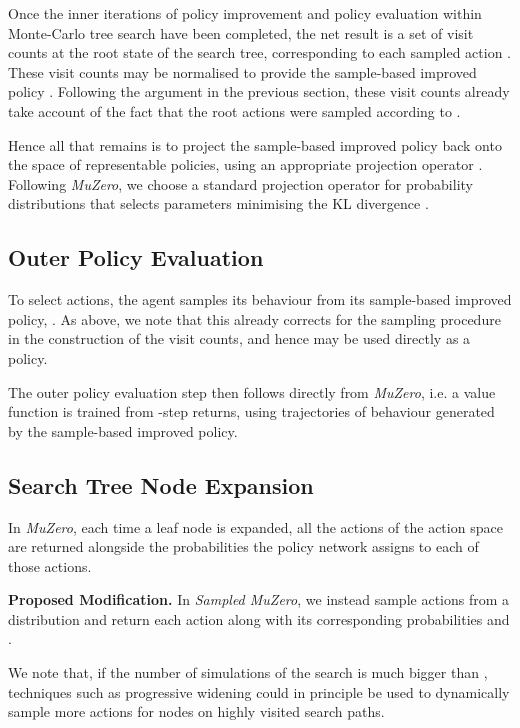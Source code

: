 \documentclass{article}
\newcommand{\muzero}{\emph{MuZero}}
\newcommand{\smuzero}{\emph{Sampled MuZero}}
\begin{document}
Once the inner iterations of policy improvement and policy evaluation within Monte-Carlo tree search have been completed, the net result is a set of visit counts  at the root state  of the search tree, corresponding to each sampled action . These visit counts may be normalised to provide the sample-based improved policy . Following the argument in the previous section, these visit counts already take account of the fact that the root actions were sampled according to .

Hence all that remains is to project the sample-based improved policy back onto the space of representable policies, using an appropriate projection operator . Following \muzero{}, we choose a standard projection operator for probability distributions that selects parameters  minimising the KL divergence .

\subsection{Outer Policy Evaluation}

To select actions, the agent samples its behaviour from its sample-based improved policy, . As above, we note that this already corrects for the sampling procedure in the construction of the visit counts, and hence may be used directly as a policy.

The outer policy evaluation step then follows directly from \muzero{}, i.e. a value function is trained from -step returns, using trajectories of behaviour generated by the sample-based improved policy.

\subsection{Search Tree Node Expansion}

In \muzero{}, each time a leaf node is expanded, all the  actions of the action space are returned alongside the probabilities  the policy network assigns to each of those actions.

\textbf{Proposed Modification.}
In \smuzero{}, we instead sample  actions from a distribution  and return each action  along with its corresponding probabilities  and .

We note that, if the number of simulations of the search is much bigger than , techniques such as progressive widening \cite{progressive_widening} could in principle be used to dynamically sample more actions for nodes on highly visited search paths.
\end{document}

